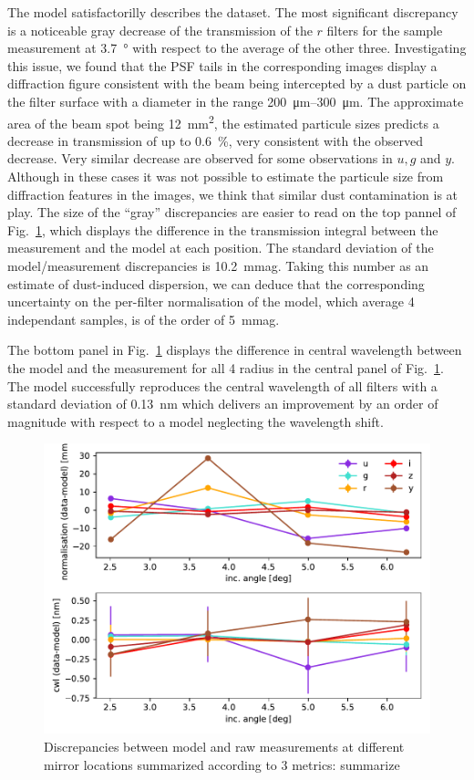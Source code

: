 The model satisfactorilly describes the dataset. The most significant
discrepancy is a noticeable gray decrease of the transmission of the
$r$ filters for the sample measurement at \SI{3.7}{\degree} with
respect to the average of the other three. Investigating this issue,
we found that the PSF tails in the corresponding images display a
diffraction figure consistent with the beam being intercepted by a
dust particle on the filter surface with a diameter in the range
\SIrange{200}{300}{\micro\meter}. The approximate area of the beam
spot being \SI{12}{mm\squared}, the estimated particule sizes predicts
a decrease in transmission of up to \SI{0.6}{\percent}, very
consistent with the observed decrease. Very similar decrease are
observed for some observations in $u,g$ and $y$. Although in these
cases it was not possible to estimate the particule size from
diffraction features in the images, we think that similar dust
contamination is at play. The size of the ``gray'' discrepancies are
easier to read on the top pannel of Fig.~\ref{fig:metrics}, which
displays the difference in the transmission integral between the
measurement and the model at each position. The standard deviation of
the model/measurement discrepancies is \SI{10.2}{mmag}. Taking this
number as an estimate of dust-induced dispersion, we can deduce that
the corresponding uncertainty on the per-filter normalisation of the
model, which average 4 independant samples, is of the order of
\SI{5}{mmag}.

The bottom panel in Fig.~\ref{fig:metrics} displays the difference in
central wavelength between the model and the measurement for all 4
radius in the central panel of Fig.~\ref{fig:metrics}. The model
successfully reproduces the central wavelength of all filters with a
standard deviation of \SI{0.13}{nm} which delivers an improvement by
an order of magnitude with respect to a model neglecting the
wavelength shift. 

\begin{figure}
  \centering
  \includegraphics[width=1\linewidth]{fig/metrics.pdf}
  \caption{Discrepancies between model and raw measurements at different mirror locations summarized according to 3 metrics: summarize}
  \label{fig:metrics}
\end{figure}

